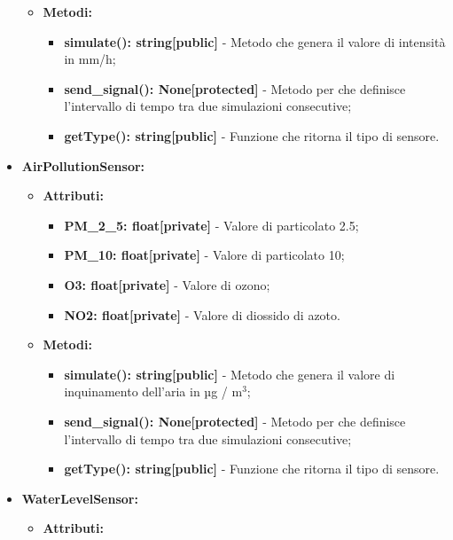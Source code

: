 \documentclass[8pt]{article}
\begin{document}
\begin{itemize}
\begin{itemize}
        \item \textbf{Metodi:}
        \begin{itemize}
	\setlength\itemsep{0em}
            \item \textbf{simulate(): string[public]} - Metodo che genera il valore di intensità in mm/h;
            \item \textbf{send\_signal(): None[protected]} - Metodo per che definisce l'intervallo di tempo tra due simulazioni consecutive;
            \item \textbf{getType(): string[public]} - Funzione che ritorna il tipo di sensore.
        \end{itemize}
    \end{itemize}
    \item \textbf{AirPollutionSensor:}
    \begin{itemize}
	\setlength\itemsep{0em}
        \item \textbf{Attributi:}
        \begin{itemize}
	\setlength\itemsep{0em}
            \item \textbf{PM\_2\_5: float[private]} - Valore di particolato 2.5;
            \item \textbf{PM\_10: float[private]} - Valore di particolato 10;
            \item \textbf{O3: float[private]} - Valore di ozono;
            \item \textbf{NO2: float[private]} - Valore di diossido di azoto.
        \end{itemize}
        \item \textbf{Metodi:}
        \begin{itemize}
	\setlength\itemsep{0em}
            \item \textbf{simulate(): string[public]} - Metodo che genera il valore di inquinamento dell'aria in µg / $\mbox{m}^{\mbox{3}}$;
            \item \textbf{send\_signal(): None[protected]} - Metodo per che definisce l'intervallo di tempo tra due simulazioni consecutive;
            \item \textbf{getType(): string[public]} - Funzione che ritorna il tipo di sensore.
        \end{itemize}
    \end{itemize}
    \item \textbf{WaterLevelSensor:}
    \begin{itemize}
	\setlength\itemsep{0em}
        \item \textbf{Attributi:}

\end{itemize}
\end{itemize}
\end{document}
